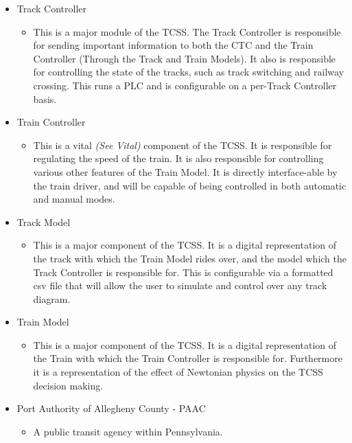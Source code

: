 \documentclass{article}
\begin{document}
\begin{itemize}
        \item Track Controller
            \begin{itemize}
            \item This is a major module of the TCSS. The Track Controller is responsible for sending important information to both the CTC and the Train Controller (Through the Track and Train Models). It also is responsible for controlling the state of the tracks, such as track switching and railway crossing. This runs a PLC and is configurable on a per-Track Controller basis.
            \end{itemize}
        \item Train Controller
            \begin{itemize}
            \item This is a vital  \emph{(See Vital)} component of the TCSS. It is responsible for regulating the speed of the train. It is also responsible for controlling various other features of the Train Model. It is directly interface-able by the train driver, and will be capable of being controlled in both automatic and manual modes. 
            \end{itemize}
        \item Track Model
            \begin{itemize}
            \item This is a major component of the TCSS. It is a digital representation of the track with which the Train Model rides over, and the model which the Track Controller is responsible for. This is configurable via a formatted csv file that will allow the user to simulate and control over any track diagram.
            \end{itemize}
        \item Train Model
            \begin{itemize}
            \item This is a major component of the TCSS. It is a digital representation of the Train with which the Train Controller is responsible for. Furthermore it is a representation of the effect of Newtonian physics on the TCSS decision making.
            \end{itemize}
        \item Port Authority of Allegheny County - PAAC
            \begin{itemize}
            \item A public transit agency within Pennsylvania.
            \end{itemize}    

\end{itemize}
\end{document}

